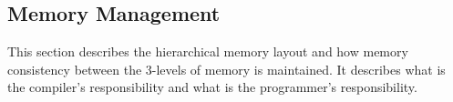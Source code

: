 \subsection{Memory Management}

This section describes the hierarchical memory layout and how memory consistency between the 3-levels of memory is maintained.  It describes what is the compiler's responsibility and what is the programmer's responsibility.








